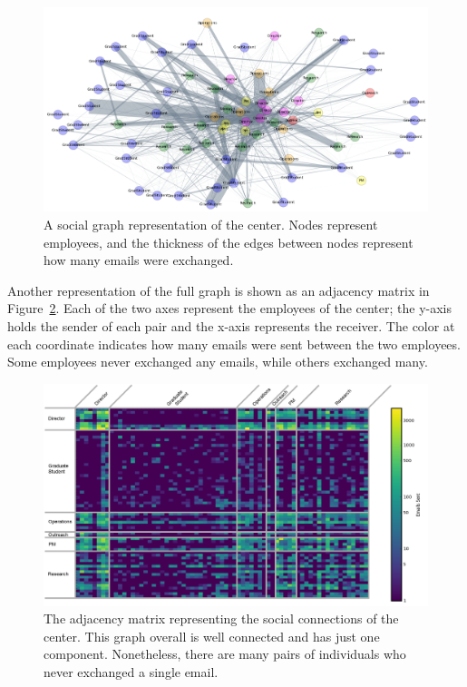 \documentclass[12pt]{report}
\begin{document}
\begin{figure}[t]
    \centering
    \includegraphics[width=\columnwidth,trim={0mm 0mm 0mm 0mm},clip]{color_social_network}
    \vspace{-17pt}
    \caption[The social network of the center]{A social graph representation of the center.  Nodes represent employees, and the thickness of the edges between nodes represent how many emails were exchanged.}
    \label{fig:social_net}
\end{figure}



Another representation of the full graph is shown as an adjacency matrix in Figure~\ref{fig:adj_matrix}.
Each of the two axes represent the employees of the center; the y-axis holds the sender of each pair and the x-axis represents the receiver.
The color at each coordinate indicates how many emails were sent between the two employees.
Some employees never exchanged any emails, while others exchanged many.

\begin{figure}[t]
	\centering
	\includegraphics[width=1.05\columnwidth,trim={0mm 0mm 0mm 5mm},clip]{ViridisEdit}
	\vspace{-17pt}
	\caption[The dataset represented as an adjacency matrix]{The adjacency matrix representing the social connections of the center.  This graph overall is well connected and has just one component.  Nonetheless, there are many pairs of individuals who never exchanged a single email.}
	\label{fig:adj_matrix}
\end{figure}
\end{document}
